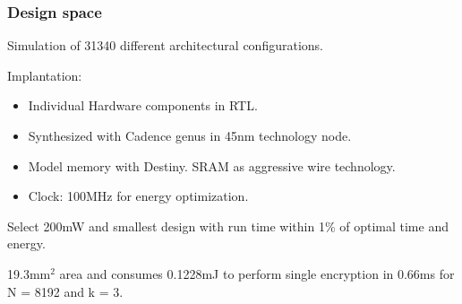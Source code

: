 \documentclass[10pt]{beamer}
\begin{document}
\begin{frame}
\frametitle{Design space}
Simulation of 31340 different architectural configurations.

Implantation:
\pause
\begin{itemize}
    \item Individual Hardware components in RTL.
    \item Synthesized with Cadence genus in 45nm technology node.
\pause
    \item Model memory with Destiny. SRAM as aggressive wire technology.
    \item Clock: 100MHz for energy optimization.
\end{itemize}


\pause
Select 200mW and smallest design with run time within 1\% of optimal time and energy.

19.3mm$^2$ area and consumes 0.1228mJ to perform single encryption in 0.66ms for N = 8192 and k = 3.
\end{frame}






\end{document}

